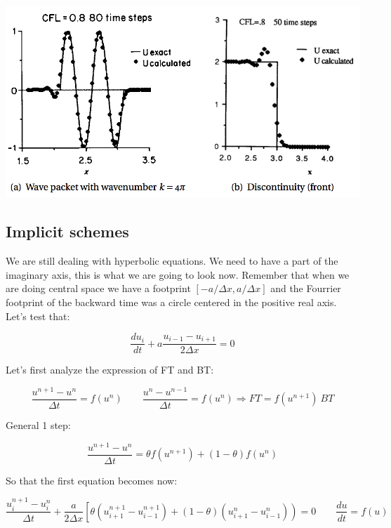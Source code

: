 \begin{center}
\includegraphics[scale=0.5]{ch3/13}
\end{center}


\subsection{Implicit schemes}
We are still dealing with hyperbolic equations. We need to have a part of the imaginary axis, this is what we are going to look now. Remember that when we are doing central space we have a footprint $[-a/\Delta x, a/\Delta x]$ and the Fourrier footprint of the backward time was a circle centered in the positive real axis. Let's test that: 

\begin{equation}
\frac{du_i}{dt} + a \frac{u_{i-1}-u_{i+1}}{2\Delta x} = 0
\end{equation}

Let's first analyze the expression of FT and BT: 

\begin{equation}
\frac{u^{n+1}- u^n}{\Delta t} = f(u^n) \qquad \frac{u^{n}- u^{n-1}}{\Delta t} = f(u^n) \Rightarrow FT = f(u^{n+1})\ BT
\end{equation}

General 1 step: 

\begin{equation}
\frac{u^{n+1}-u^n}{\Delta t} = \theta f(u^{n+1}) + (1-\theta)f(u^n)
\end{equation}

So that the first equation becomes now:

\begin{equation}
\frac{u_i^{n+1}-u_i^n}{\Delta t} + \frac{a}{2\Delta x} \left[ \theta (u_{i+1}^{n+1}-u_{i-1}^{n+1})+ (1-\theta )(u_{i+1}^n - u_{i-1}^n)  \right) = 0 \qquad \frac{du}{dt} = f(u)
\end{equation}

